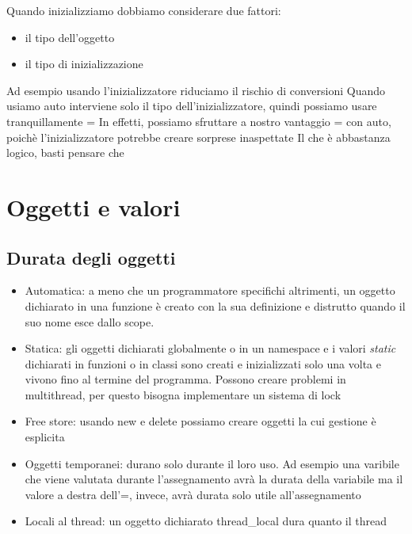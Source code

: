 \documentclass[11pt,a4paper]{book}
\begin{document}
Quando inizializziamo dobbiamo considerare due fattori:
\begin{itemize}
	\item il tipo dell'oggetto
	\item il tipo di inizializzazione
\end{itemize}
\label{code: 067}
Ad esempio usando l'inizializzatore {} riduciamo il rischio di conversioni
\label{code: 068}
Quando usiamo auto interviene solo il tipo dell'inizializzatore, quindi possiamo usare tranquillamente =
\label{code: 069}
In effetti, possiamo sfruttare a nostro vantaggio = con auto, poichè l'inizializzatore {} potrebbe creare sorprese inaspettate
\label{code: 070}
Il che è abbastanza logico, basti pensare che
\label{code: 071}

\section{Oggetti e valori}
\subsection{Durata degli oggetti}
\begin{itemize}
	\item Automatica: a meno che un programmatore specifichi altrimenti, un oggetto dichiarato in una funzione è creato con la sua definizione e distrutto quando il suo nome esce dallo scope.
	\item Statica: gli oggetti dichiarati globalmente o in un namespace e i valori \emph{static} dichiarati in funzioni o in classi sono creati e inizializzati solo una volta e vivono fino al termine del programma. Possono creare problemi in multithread, per questo bisogna implementare un sistema di lock
	\item Free store: usando new e delete possiamo creare oggetti la cui gestione è esplicita
	\item Oggetti temporanei: durano solo durante il loro uso. Ad esempio una varibile che viene valutata durante l'assegnamento avrà la durata della variabile ma il valore a destra dell'=, invece, avrà durata solo utile all'assegnamento
	\item Locali al thread: un oggetto dichiarato thread\_local dura quanto il thread
\end{itemize}
\end{document}
